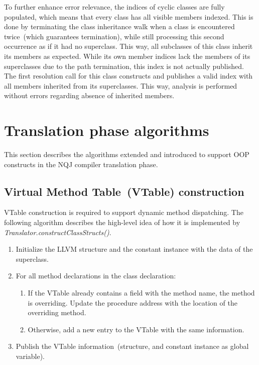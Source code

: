 \documentclass[]{tukportfolio}
\begin{document}
To further enhance error relevance, the indices of cyclic classes are fully populated, which means that every class has all visible members indexed. This is done by terminating the class inheritance walk when a class is encountered twice~(which guarantees termination), while still processing this second occurrence as if it had no superclass. This way, all subclasses of this class inherit its members as expected. While its own member indices lack the members of its superclasses due to the path termination, this index is not actually published. The first resolution call for this class constructs and publishes a valid index with all members inherited from its superclasses. This way, analysis is performed without errors regarding absence of inherited members.

\section{Translation phase algorithms}

This section describes the algorithms extended and introduced to support OOP constructs in the NQJ compiler translation phase.

\subsection{Virtual Method Table~(VTable) construction}
\label{subsec:vtablecons}

VTable construction is required to support dynamic method dispatching. The following algorithm describes the high-level idea of how it is implemented by \textit{Translator.constructClassStructs()}.

\begin{enumerate}
  \item Initialize the LLVM structure and the constant instance with the data of the superclass.
  \item For all method declarations in the class declaration:
    \begin{enumerate}
      \item If the VTable already contains a field with the method name, the method is overriding. Update the procedure address with the location of the overriding method.
      \item Otherwise, add a new entry to the VTable with the same information.
    \end{enumerate}
  \item Publish the VTable information~(structure, and constant instance as global variable).
\end{enumerate}
\end{document}
